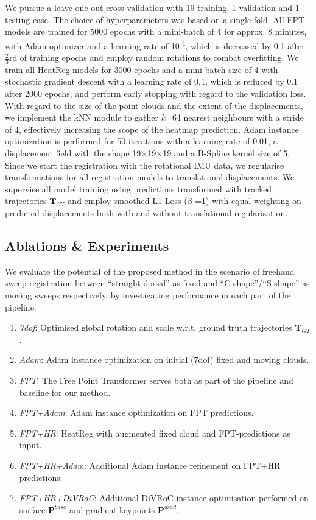We pursue a leave-one-out cross-validation with 19 training, 1 validation and 1 testing case. The choice of hyperparameters was based on a single fold. All FPT models are trained for 5000 epochs with a mini-batch of 4 for approx. 8 minutes, with Adam optimizer and a learning rate of 10\textsuperscript{-4}, which is decreased by 0.1 after \(\frac{2}{3}\)rd of training epochs and employ random rotations to combat overfitting. We train all HeatReg models for 3000 epochs and a mini-batch size of 4 with stochastic gradient descent with a learning rate of 0.1, which is reduced by 0.1 after 2000 epochs, and perform early stopping with regard to the validation loss. With regard to the size of the point clouds and the extent of the displacements, we implement the kNN module to gather $k$=64 nearest neighbours with a stride of 4, effectively increasing the scope of the heatmap prediction. Adam instance optimization is performed for 50 iterations with a learning rate of 0.01, a displacement field with the shape 19$\times$19$\times$19 and a B-Spline kernel size of 5. Since we start the registration with the rotational IMU data, we regularise transformations for all registration models to translational displacements. We supervise all model training using predictions transformed with tracked trajectories $\mathbf{T}_{GT}$ and employ smoothed L1 Loss \citep{girshick2015fast} ($\beta$ =1) with equal weighting on predicted displacements both with and without translational regularisation.

\subsection{Ablations \& Experiments}
We evaluate the potential of the proposed method in the scenario of freehand sweep registration between ``straight dorsal'' as fixed and ``C-shape''/``S-shape''  as moving sweeps respectively, by investigating performance in each part of the pipeline:
\begin{enumerate}
    \item \textit{7dof}: Optimised global rotation and scale w.r.t. ground truth trajectories $\mathbf{T}_{GT}$.
    \item \textit{Adam}: Adam instance optimization on initial (7dof) fixed and moving clouds.
    \item \textit{FPT}: The Free Point Transformer \citep{baum2021real} serves both as part of the pipeline and baseline for our method.
    \item \textit{FPT+Adam}: Adam instance optimization on FPT predictions.
    \item \textit{FPT+HR}: HeatReg with augmented fixed cloud and FPT-predictions as input.
    \item \textit{FPT+HR+Adam}: Additional Adam instance refinement on FPT+HR predictions.
    \item \textit{FPT+HR+DiVRoC}: Additional DiVRoC instance optimisation performed on surface $\mathbf{P}^{base}$ and gradient keypoints $\mathbf{P}^{grad}$.
\end{enumerate}


